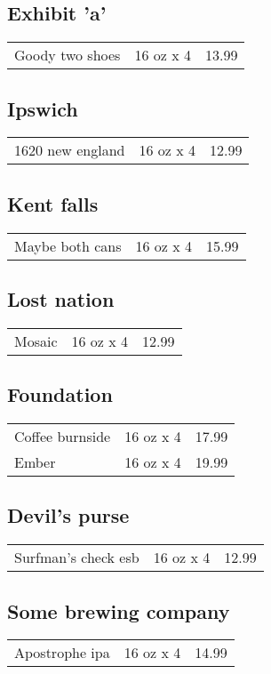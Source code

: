 \documentclass{article}%
\begin{document}
\begin{multicols}{3}
%
\subsection*{Exhibit 'a'}%
\begin{tabular}{l c r}%
Goody two shoes&16 oz x 4&13.99\\%
\end{tabular}

%
\subsection*{Ipswich}%
\begin{tabular}{l c r}%
1620 new england&16 oz x 4&12.99\\%
\end{tabular}

%
\subsection*{Kent falls}%
\begin{tabular}{l c r}%
Maybe both cans&16 oz x 4&15.99\\%
\end{tabular}

%
\subsection*{Lost nation}%
\begin{tabular}{l c r}%
Mosaic&16 oz x 4&12.99\\%
\end{tabular}

%
\subsection*{Foundation}%
\begin{tabular}{l c r}%
Coffee burnside&16 oz x 4&17.99\\%
Ember&16 oz x 4&19.99\\%
\end{tabular}

%
\subsection*{Devil's purse}%
\begin{tabular}{l c r}%
Surfman's check esb&16 oz x 4&12.99\\%
\end{tabular}

%
\subsection*{Some brewing company}%
\begin{tabular}{l c r}%
Apostrophe ipa&16 oz x 4&14.99\\%
\end{tabular}


\end{multicols}
\end{document}
